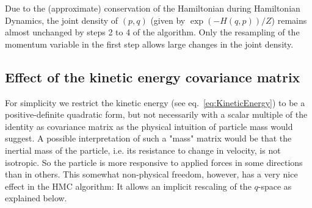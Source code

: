 Due to the (approximate) conservation of the Hamiltonian during Hamiltonian Dynamics, the joint density of $(p,q)$ (given by $\exp \left( -H(q, p) \right)/Z$) remains almost unchanged by steps 2 to 4 of the algorithm. Only the resampling of the momentum variable in the first step allows large changes in the joint density. 

\subsection{Effect of the kinetic energy covariance matrix}
\label{sec:EffectOfKineticEnergyChoice}

For simplicity we restrict the kinetic energy (see eq.~\eqref{eq:KineticEnergy}) to be a positive-definite quadratic form, but not necessarily with a scalar multiple of the identity as covariance matrix as the physical intuition of particle mass would suggest. A possible interpretation of such a "mass" matrix would be that the inertial mass of the particle, i.e. its resistance to change in velocity, is not isotropic. So the particle is more responsive to applied forces in some directions than in others. This somewhat non-physical freedom, however, has a very nice effect in the HMC algorithm: It allows an implicit rescaling of the $q$-space as explained below.

